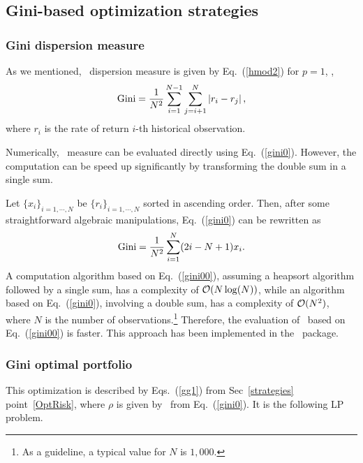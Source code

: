 
\subsection{Gini-based optimization strategies}\label{S:GINI}


\subsubsection{Gini dispersion measure}
As we mentioned, \GINI\ dispersion measure is given by Eq.~(\ref{hmod2}) for $p=1$, \ie,
\begin{equation}
    \GINI = \frac{1}{N^2}\sum_{i=1}^{N-1}\sum_{j=i+1}^N \left| r_i - r_j \right|,
    \label{gini0}
\end{equation}
where $r_i$ is the rate of return $i$-th historical observation.

Numerically, \GINI\ measure can be evaluated directly using Eq.~(\ref{gini0}). However, the computation can be
speed up significantly by transforming the double sum in a single sum.

Let $\{x_i\}_{i=1,\cdots,N}$ be $\{r_i\}_{i=1,\cdots,N}$ sorted in ascending order. Then, after some straightforward
algebraic manipulations, Eq.~(\ref{gini0}) can be rewritten as
\begin{equation}
    \GINI = \frac{1}{N^2}\sum_{i=1}^N (2 i - N  + 1) x_i.
    \label{gini00}
\end{equation}
A computation algorithm based on
Eq.~(\ref{gini00}), assuming a heapsort algorithm followed by a single sum, has a complexity of ${\cal O}(N \log(N))$,
while an algorithm based on Eq.~(\ref{gini0}), involving a double sum, has a complexity of ${\cal O}(N^2)$, where $N$ is
the number of observations.\footnote{As a guideline, a typical value for $N$ is $1,000$.}
Therefore, the evaluation of \GINI\ based on Eq.~(\ref{gini00}) is faster.
This approach has been implemented in the \azapy\ package.

\BackToContents

\subsubsection{Gini optimal portfolio}
This optimization is described by Eqs.~(\ref{gg1}) from Sec~\ref{strategies} point~\ref{OptRisk},
where $\rho$ is given by \GINI\ from Eq.\ (\ref{gini0}).
It is the following LP problem.


